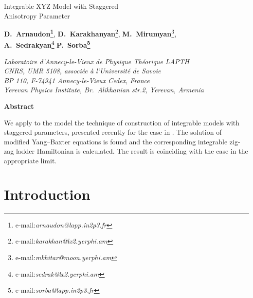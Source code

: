 \documentclass[a4paper,11pt]{article}
\begin{document}
\begin{center} 
{\LARGE \textsf{
Integrable XYZ Model with Staggered 
\\[4mm]
Anisotropy Parameter}} 

\vspace{36pt}
{\large
{\bf D.~Arnaudon\footnote{e-mail:{\sl arnaudon@lapp.in2p3.fr}}},
{\bf D.~Karakhanyan}\footnote{e-mail:{\sl karakhan@lx2.yerphi.am}},
{\bf M.~Mirumyan}\footnote{e-mail:{\sl mkhitar@moon.yerphi.am}},\\

{\bf A.~Sedrakyan}\footnote{e-mail:{\sl sedrak@lx2.yerphi.am}}
{\bf P.~Sorba\footnote{e-mail:{\sl sorba@lapp.in2p3.fr}}}\\ 
}

\vspace{30pt}

\emph{Laboratoire d'Annecy-le-Vieux de Physique Th\'eorique LAPTH}
\\
\emph{CNRS, UMR 5108, associ\'ee {\`a} l'Universit\'e de Savoie}
\\
\emph{BP 110, F-74941 Annecy-le-Vieux Cedex, France}
\\
\emph{Yerevan Physics Institute, Br.~Alikhanian str.2, Yerevan, Armenia}
\vspace{36pt}

\vfill
{\bf Abstract}
\end{center}

We apply to the \coordHE{} model the technique of construction of integrable 
models with staggered parameters, presented recently for the \coordHE{} case
in \cite{APSS}. The solution of modified
Yang--Baxter equations is found and the corresponding integrable  
zig-zag ladder Hamiltonian is calculated. The result is coinciding
with the \coordHE{} case in the appropriate limit.

\vfill
{}

\newpage
\pagestyle{plain}


\section{Introduction}
\setcounter{equation}{0}
\indent
\end{document}
